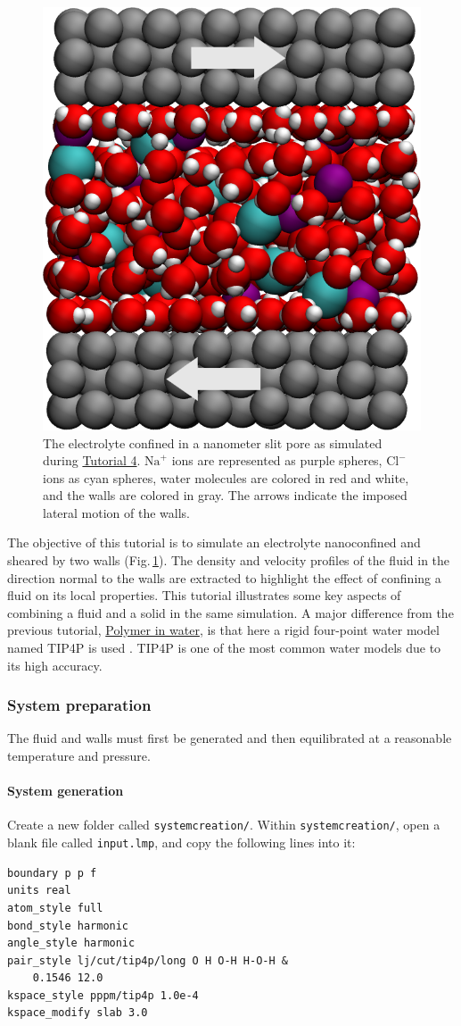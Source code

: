 \documentclass[9pt,tutorial]{livecoms}
\newcommand{\flrcmd}[1]{\textcolor{command}{\texttt{#1}}} %
\newcommand{\flecmd}[1]{\textcolor{command}{\texttt{#1}}} %
\begin{document}
\begin{figure}
\centering
\includegraphics[width=0.55\linewidth]{NANOSHEAR}
\caption{The electrolyte confined in a nanometer slit pore as simulated during
\hyperref[sheared-confined-label]{Tutorial 4}. $\text{Na}^+$ ions are represented
as purple spheres, $\text{Cl}^-$ ions as cyan spheres, water molecules are colored
in red and white, and the walls are colored in gray. The arrows indicate the
imposed lateral motion of the walls.}
\label{fig:NANOSHEAR}
\end{figure}

\noindent The objective of this tutorial is to simulate an electrolyte
nanoconfined and sheared by two walls (Fig.\,\ref{fig:NANOSHEAR}). The density
and velocity profiles of the fluid in the direction normal to the walls are
extracted to highlight the effect of confining a fluid on its local properties.
This tutorial illustrates some key aspects of combining a fluid and a solid in
the same simulation. A major difference from the previous tutorial,
\hyperref[all-atoms-label]{Polymer in water}, is that here a rigid four-point
water model named TIP4P is used \cite{abascal2005general}. TIP4P is one of
the most common water models due to its high accuracy.

\subsubsection{System preparation}
The fluid and walls must first be generated and then equilibrated at a reasonable
temperature and pressure.

\paragraph{System generation}
Create a new folder called \flrcmd{systemcreation/}. Within
\flrcmd{systemcreation/}, open a blank file called \flecmd{input.lmp}, and
copy the following lines into it:
\begin{lstlisting}
boundary p p f
units real
atom_style full
bond_style harmonic
angle_style harmonic
pair_style lj/cut/tip4p/long O H O-H H-O-H &
    0.1546 12.0
kspace_style pppm/tip4p 1.0e-4
kspace_modify slab 3.0
\end{lstlisting}
\end{document}
